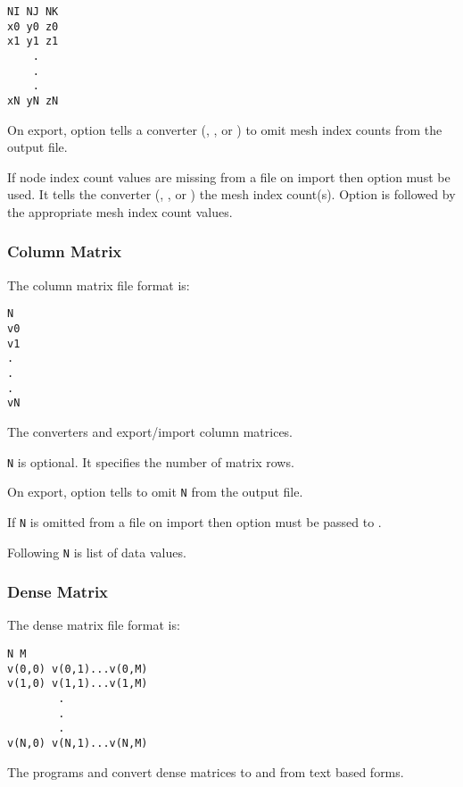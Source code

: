 \begin{verbatim}
NI NJ NK
x0 y0 z0
x1 y1 z1
    .
    .
    .
xN yN zN
\end{verbatim}

On export, option  tells a converter
(, , or
) to omit mesh index counts
from the output file.

If node index count values are missing from a file on import then
option  must be used.  It tells the converter
(,
, or
) the mesh index count(s).  Option
 is followed by the appropriate mesh index count
values.

\subsubsection{Column Matrix}

The column matrix file format is:

\begin{verbatim}
N
v0 
v1
.
.
.
vN
\end{verbatim}

The converters  and  
export/import column matrices.

\verb|N| is optional.  It specifies the number of matrix rows.  

On export, option  tells
 to omit \verb|N| from the output file.

If \verb|N| is omitted from a file on import then option
 must be passed to .

Following \verb|N| is list of data values.

\subsubsection{Dense Matrix}

The dense matrix file format is:

\begin{verbatim}
N M
v(0,0) v(0,1)...v(0,M)
v(1,0) v(1,1)...v(1,M)
        .
        .
        .
v(N,0) v(N,1)...v(N,M)
\end{verbatim}

The programs  and  
convert dense matrices to and from text based forms.

